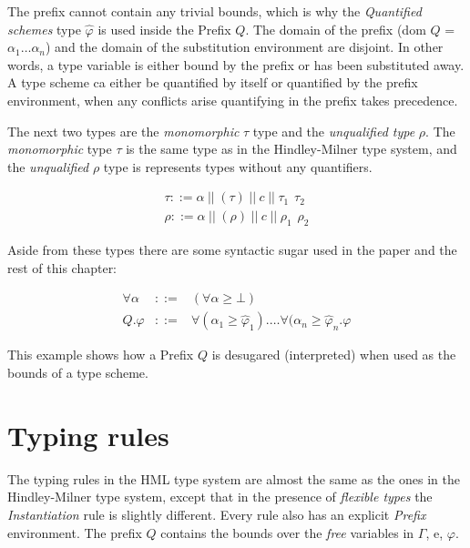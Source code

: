 The prefix cannot contain any trivial bounds, which is why the \emph{Quantified schemes} type $\hat{\varphi}$ is used inside the Prefix $Q$. The domain of the prefix (dom $Q$ = ${\alpha_1 \ldots \alpha_n}$) and the domain of the substitution environment are disjoint. In other words, a type variable is either bound by the prefix or has been substituted away. A type scheme ca either be quantified by itself or quantified by the prefix environment, when any conflicts arise quantifying in the prefix takes precedence.

The next two types are the \emph{monomorphic} $\tau$ type and the \emph{unqualified type} $\rho$. The \emph{monomorphic} type $\tau$ is the same type as in the Hindley-Milner type system, and the \emph{unqualified} $\rho$ type is represents types without any quantifiers. 

\begin{eqnarray*}
\tau  ::= \alpha \hspace{3pt} || \hspace{3pt} (\tau) \hspace{3pt} || \hspace{3pt} c \hspace{3pt} || \hspace{3pt} \tau_1 \hspace{5pt} \tau_2 \\
\rho  ::= \alpha \hspace{3pt} || \hspace{3pt} (\rho) \hspace{3pt} || \hspace{3pt} c \hspace{3pt} || \hspace{3pt} \rho_1 \hspace{5pt} \rho_2
\end{eqnarray*}

Aside from these types there are some syntactic sugar used in the paper and the rest of this chapter:
\label{syntax}

\begin{eqnarray*}
\forall \alpha & ::= & (\forall \alpha \geq \bot) \\
Q.\varphi & ::= & \forall(\alpha_1 \geq \hat{\varphi}_1). \ldots \forall(\alpha_n \geq \hat{\varphi}_n . \varphi
\end{eqnarray*}

This example shows how a Prefix $Q$ is desugared (interpreted) when used as the bounds of a type scheme.
 
\section{Typing rules}
The typing rules in the HML type system are almost the same as the ones in the Hindley-Milner type system, except that in the presence of \textit{flexible types} the \emph{Instantiation} rule is slightly different. Every rule also has an explicit \textit{Prefix} environment. The prefix $Q$ contains the bounds over the \emph{free} variables in $\Gamma$, e, $\varphi$.

